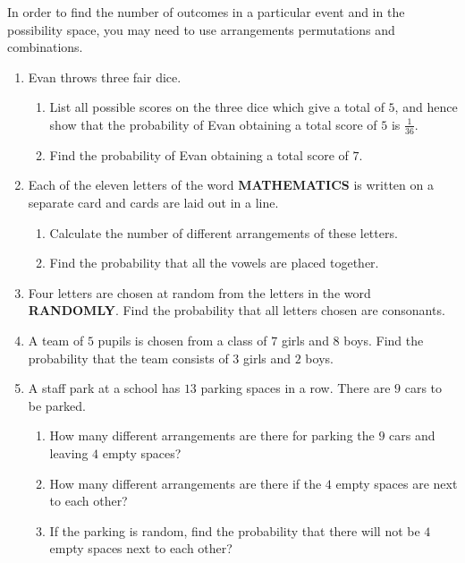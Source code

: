 In order to find the number of outcomes in a particular event and in the possibility space, you may need to use arrangements permutations and combinations.


\exercise  %


\begin{enumerate}
	\item Evan throws three fair dice.
	\begin{enumerate}
		\item List all possible scores on the three dice which give a total of $5$,  and hence show that the probability of Evan obtaining a total score of $5$ is $\frac{1}{36}$.
		\item Find the probability of Evan obtaining a total score of $7$.
	\end{enumerate}

   \item Each of the eleven letters of the word \textbf{MATHEMATICS} is written on a separate card and cards are laid out in a line.
   
   \begin{enumerate}
   	\item Calculate the number of different arrangements of these letters.
   	\item Find the probability that all the vowels are placed together.
   \end{enumerate}


\item Four letters are chosen at random from the letters in the word \textbf{RANDOMLY}. Find the probability that all letters chosen are consonants.

\item A team of $5$ pupils is chosen from a class of $7$ girls and $8$ boys. Find the probability that the team consists of $3$ girls and $2$ boys.

\item  A staff park at a school has $13$ parking spaces in a row.  There are $9$ cars to be parked.
\begin{enumerate}
	\item How many different arrangements are there for parking the $9$ cars and leaving $4$ empty spaces?
	\item How many different arrangements are there if the $4$ empty spaces are next to each other?
	\item If the parking is random, find the probability that there will not be $4$ empty spaces next to each other?
\end{enumerate}



\end{enumerate}
